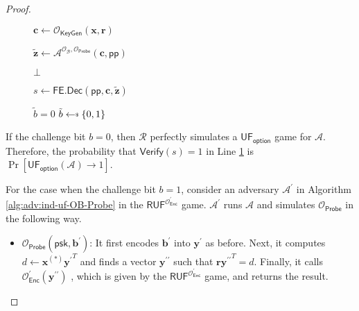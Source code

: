 \begin{proof}
\begin{figure}[h]
\begin{minipage}[t]{0.6\linewidth}
\begin{algorithm}[H]
\begin{algorithmic}[1]
		\State $\mathbf{c} \gets \mathcal{O}_{\textsf{KeyGen}}(\mathbf{x}, \mathbf{r})$

		\State ${\mathbf{\tilde{z}}} \gets \mathcal{A}^{\mathcal{O}_{\mathcal{B}}, \mathcal{O}_{\textsf{Probe}} } ( \mathbf{c}, \textsf{pp})$


			\State \Return $\bot$

		\EndIf

		\State $s \gets \textsf{FE.Dec}( \textsf{pp}, \mathbf{c}, \mathbf{\tilde{z}} )$

		 \label{alg:red:ind-uf-OB-Probe:verify}
			\State \Return $\tilde{b} = 0$
		\Else
			\State \Return $\tilde{b} \getsdollar \{0, 1\}$
		\EndIf

	\end{algorithmic}
	\end{algorithm}
	\end{minipage}
	
\end{figure}

If the challenge bit $b = 0$, then $\mathcal{R}$ perfectly simulates a $\textsf{UF}_\textsf{option}$ game for $\mathcal{A}$. Therefore, the probability that $\textsf{Verify}(s) = 1$ in Line \ref{alg:red:ind-uf-OB-Probe:verify} is $\Pr[\textsf{UF}_\textsf{option}(\mathcal{A}) \to 1]$.

For the case when the challenge bit $b = 1$, consider an adversary $\mathcal{A}^\prime$ in Algorithm \ref{alg:adv:ind-uf-OB-Probe} in the $\textsf{RUF}^{ \mathcal{O}^\prime_{\textsf{Enc}} }$ game. $\mathcal{A}^\prime$ runs $\mathcal{A}$ and simulates $\mathcal{O}_{\textsf{Probe}}$ in the following way.

\begin{itemize}

	\item $\mathcal{O}_{\textsf{Probe}}( \textsf{psk}, \mathbf{b}^\prime )$: It first encodes $\mathbf{b}^\prime$ into $\mathbf{y}^\prime$ as before. Next, it computes $d \gets \mathbf{x}^{(*)}{\mathbf{y}^\prime}^T$ and finds a vector $\mathbf{y}^{\prime\prime}$ such that $\mathbf{r}{\mathbf{y}^{\prime\prime}}^T = d$. Finally, it calls $\mathcal{O}^\prime_{\textsf{Enc}} (\mathbf{y}^{\prime\prime} )$ , which is given by the $\textsf{RUF}^{ \mathcal{O}^\prime_{\textsf{Enc}} }$ game, and returns the result.

\end{itemize}


\end{proof}
